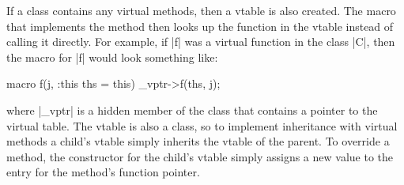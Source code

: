 If a class contains any virtual methods, then a vtable is also created.
The macro that implements the method then looks up the function in the
vtable instead of calling it directly.  For example, if |f| was a
virtual function in the class |C|, then the macro for |f| would look
something like:
\begin{code}
macro f(j, :this ths = this) {_vptr->f(ths, j);}
\end{code}
where |_vptr| is a hidden member of the class that contains a pointer
to the virtual table.  The vtable is also a class, so to implement
inheritance with virtual methods a child's vtable simply inherits the
vtable of the parent.  To override a method, the constructor for the
child's vtable simply assigns a new value to the entry for the method's
function pointer.




